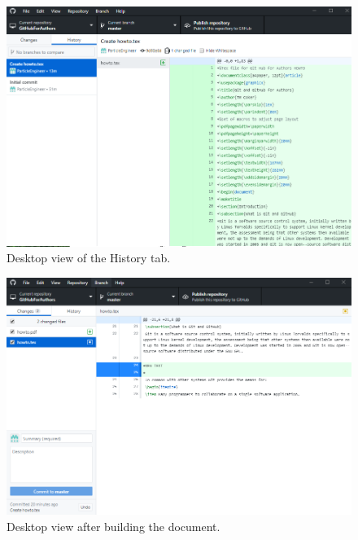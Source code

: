 \documentclass[a4paper, 12pt]{article}
\begin{document}
\begin{figure}
\centering
\includegraphics[width=\linewidth]{CommitHistory}
\caption{Desktop view of the History tab.}
\label{commithistory}
\end{figure}

\begin{figure}
\centering
\includegraphics[width=\linewidth]{FirstBuild}
\caption{Desktop view after building the document.}
\label{firstbuild}
\end{figure}
\end{document}
